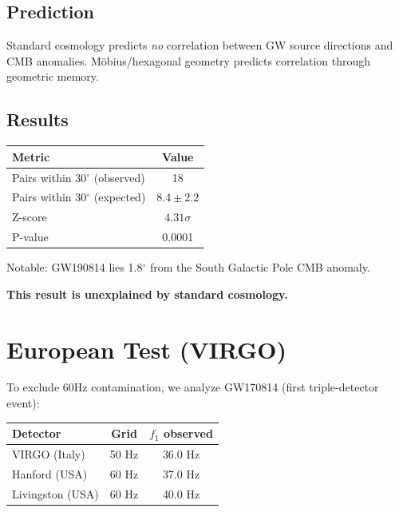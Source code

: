 \documentclass[aps,prl,twocolumn,superscriptaddress]{revtex4-2}
\begin{document}
\subsection{Prediction}

Standard cosmology predicts \textit{no} correlation between GW source directions and CMB anomalies. M\"obius/hexagonal geometry predicts correlation through geometric memory.

\subsection{Results}

\begin{table}[h]
\begin{ruledtabular}
\begin{tabular}{lc}
Metric & Value \\
\hline
Pairs within 30$^\circ$ (observed) & 18 \\
Pairs within 30$^\circ$ (expected) & $8.4 \pm 2.2$ \\
Z-score & $4.31\sigma$ \\
P-value & 0.0001 \\
\end{tabular}
\end{ruledtabular}
\end{table}

Notable: GW190814 lies 1.8$^\circ$ from the South Galactic Pole CMB anomaly.

\textbf{This result is unexplained by standard cosmology.}

\section{European Test (VIRGO)}

To exclude 60Hz contamination, we analyze GW170814 (first triple-detector event):

\begin{table}[h]
\begin{ruledtabular}
\begin{tabular}{lcc}
Detector & Grid & $f_1$ observed \\
\hline
VIRGO (Italy) & 50 Hz & 36.0 Hz \\
Hanford (USA) & 60 Hz & 37.0 Hz \\
Livingston (USA) & 60 Hz & 40.0 Hz \\
\end{tabular}
\end{ruledtabular}
\end{table}
\end{document}
